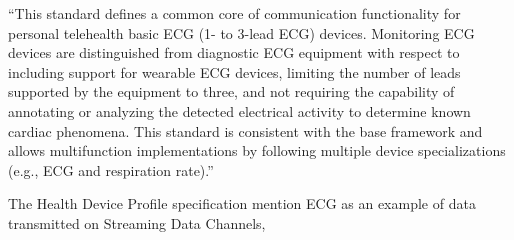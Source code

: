 ``This standard defines a common core of communication functionality for personal telehealth basic ECG (1- to 3-lead ECG) devices. Monitoring ECG devices are distinguished from diagnostic ECG equipment with respect to including support for wearable ECG devices, limiting the number of leads supported by the equipment to three, and not requiring the capability of annotating or analyzing the detected electrical activity to determine known cardiac phenomena. This standard is consistent with the base framework and allows multifunction implementations by following multiple device specializations (e.g., ECG and respiration rate).'' \cite{newRef_18}

The Health Device Profile specification mention ECG as an example of data transmitted on Streaming Data Channels,



